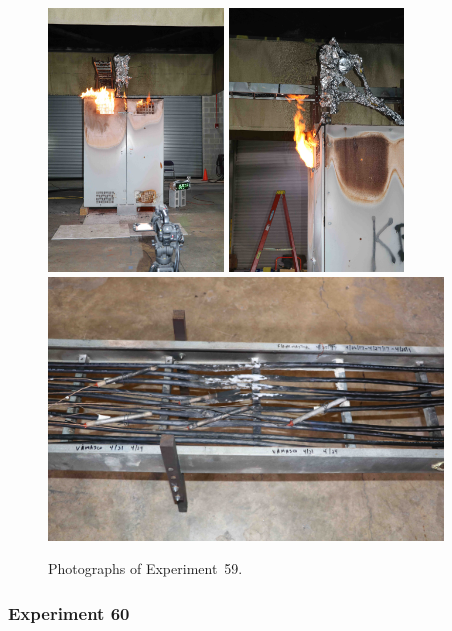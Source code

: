 \documentclass[12pt]{article}
\begin{document}
\begin{figure}[p]
\centering
\includegraphics[height=2.75in,angle=-90]{../FIGURES/Test_59_25_min_55_s}
\includegraphics[height=2.75in,angle=-90]{../FIGURES/Test_59_side} \\
\includegraphics[height=2.75in]{../FIGURES/Test_59_scar}
\caption[Photographs of Experiment~59]{Photographs of Experiment~59.}
\label{fig:Test_59_photos}
\end{figure}


\clearpage

\subsubsection{Experiment 60}
\end{document}
